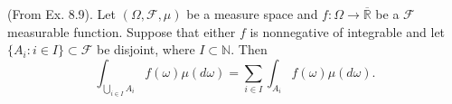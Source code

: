 \begin{tool}
    \label{tool:8.9}
    (From Ex. 8.9).
    Let $(\Omega, \mathcal{F}, \mu)$ be a measure space and $f: \Omega \to \overline{\mathbb{R}}$ be a
    $\mathcal{F}$ measurable function. Suppose that either $f$ is nonnegative of integrable and let
    $\{A_i: i \in  I\} \subset \mathcal{F}$ be disjoint, where $I \subset \mathbb{N}$. Then
    \[
    \int_{\bigcup_{i \in I} A_i} f(\omega)\mu(d\omega) = \sum_{i \in I}^{ } \int_{A_i} f(\omega)\mu(d\omega)
    .\] 
\end{tool}


